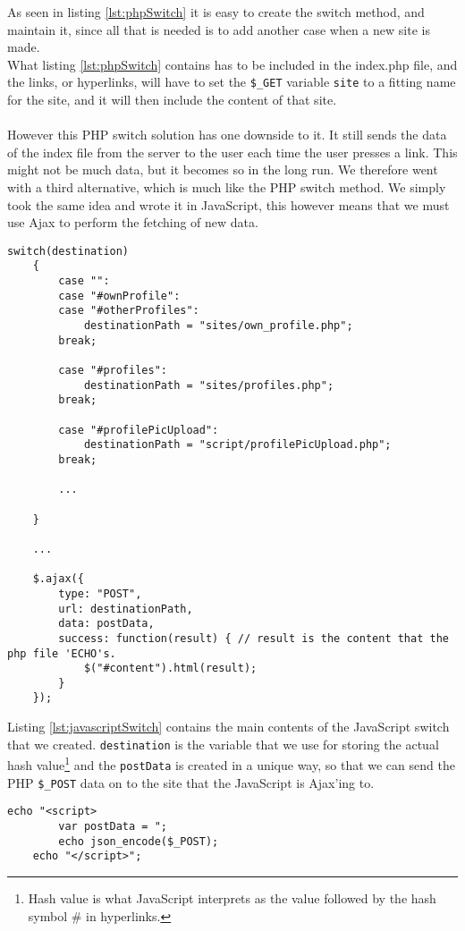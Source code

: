 As seen in listing \ref{lst:phpSwitch} it is easy to create the switch method, and maintain it, since all that is needed is to add another case when a new site is made.\\
What listing \ref{lst:phpSwitch} contains has to be included in the index.php file, and the links, or hyperlinks, will have to set the \texttt{\$\_GET} variable \texttt{site} to a fitting name for the site, and it will then include the content of that site.\\
\\
However this PHP switch solution has one downside to it. It still sends the data of the index file from the server to the user each time the user presses a link. This might not be much data, but it becomes so in the long run. We therefore went with a third alternative, which is much like the PHP switch method. We simply took the same idea and wrote it in JavaScript, this however means that we must use Ajax to perform the fetching of new data.\\
\lstset{language=Java}
\begin{lstlisting}[firstline=1,caption={The JavaScript switch},label=lst:javascriptSwitch]
switch(destination)
	{
		case "":
		case "#ownProfile":
		case "#otherProfiles":
			destinationPath = "sites/own_profile.php";
		break;
		
		case "#profiles":
			destinationPath = "sites/profiles.php";
		break;
		
		case "#profilePicUpload":
			destinationPath = "script/profilePicUpload.php";
		break;
		
		...
		
	}
	
	...
	
	$.ajax({
		type: "POST",
		url: destinationPath,
		data: postData,
		success: function(result) { // result is the content that the php file 'ECHO's.
			$("#content").html(result);
		}
	});
\end{lstlisting}

Listing \ref{lst:javascriptSwitch} contains the main contents of the JavaScript switch that we created. \texttt{destination} is the variable that we use for storing the actual hash value\footnote{Hash value is what JavaScript interprets as the value followed by the hash symbol \# in hyperlinks.} and the \texttt{postData} is created in a unique way, so that we can send the PHP \texttt{\$\_POST} data on to the site that the JavaScript is Ajax'ing to.\\
\lstset{language=PHP}
\begin{lstlisting}[firstline=1,caption={The POST transform code},label=lst:postTransform]
	echo "<script>
		var postData = ";
		echo json_encode($_POST);
	echo "</script>";
\end{lstlisting}

